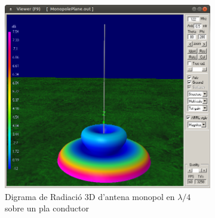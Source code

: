 	\begin{figure}[H]
	\centering
	  \begin{subfigure}[b]{0.53\textwidth}
	  \includegraphics[width=\textwidth]{./images/4.Monopole_plane/3d.png}
	  \caption{Digrama de Radiació 3D d'antena monopol en $\lambda/4$ sobre un pla conductor}
	  \label{2diag3d}
	  \end{subfigure}
	  \qquad %
	  \begin{subfigure}[b]{0.32\textwidth}

\end{subfigure}
\end{figure}
